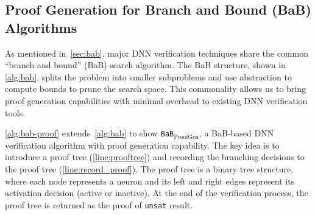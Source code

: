 \documentclass[oneside,11pt,dvipsnames]{book}
\newcommand{\proofgen}{\texttt{BaB$_{\text{ProofGen}}$}}
\newcommand{\bab}{\texttt{BaB$_{\text{NV}}$}}
\newcommand{\neuralsat}{\texttt{NeuralSAT}}
\begin{document}


\subsection{Proof Generation for Branch and Bound (BaB) Algorithms}\label{sec:proogen}

As mentioned in~\autoref{sec:bab}, major DNN verification techniques share the common ``branch and bound'' (BaB) search algorithm. The BaB structure, shown in~ \autoref{alg:bab}, splits the problem into smaller subproblems and use abstraction to compute bounds to prune the search space. This commonality allows us to bring proof generation capabilities with minimal overhead to existing DNN verification tools.

\autoref{alg:bab-proof} extends~\autoref{alg:bab} to show \proofgen, a BaB-based DNN verification algorithm with proof generation capability. The key idea is to introduce a proof tree (\autoref{line:prooftree}) and recording the branching decisions to the proof tree (\autoref{line:record_proof}).
The proof tree is a binary tree structure, where each node represents a neuron and its left and right edges represent its activation decision (active or inactive).
At the end of the verification process, the proof tree is returned as the proof of \texttt{unsat} result. 



\end{document}
